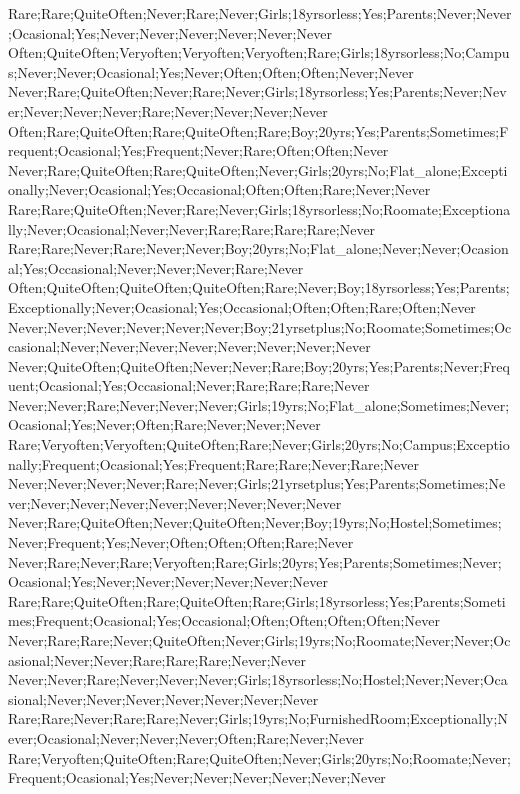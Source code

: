 Rare;Rare;QuiteOften;Never;Rare;Never;Girls;18yrsorless;Yes;Parents;Never;Never;Ocasional;Yes;Never;Never;Never;Never;Never;Never
Often;QuiteOften;Veryoften;Veryoften;Veryoften;Rare;Girls;18yrsorless;No;Campus;Never;Never;Ocasional;Yes;Never;Often;Often;Often;Never;Never
Never;Rare;QuiteOften;Never;Rare;Never;Girls;18yrsorless;Yes;Parents;Never;Never;Never;Never;Never;Rare;Never;Never;Never;Never
Often;Rare;QuiteOften;Rare;QuiteOften;Rare;Boy;20yrs;Yes;Parents;Sometimes;Frequent;Ocasional;Yes;Frequent;Never;Rare;Often;Often;Never
Never;Rare;QuiteOften;Rare;QuiteOften;Never;Girls;20yrs;No;Flat_alone;Exceptionally;Never;Ocasional;Yes;Occasional;Often;Often;Rare;Never;Never
Rare;Rare;QuiteOften;Never;Rare;Never;Girls;18yrsorless;No;Roomate;Exceptionally;Never;Ocasional;Never;Never;Rare;Rare;Rare;Rare;Never
Rare;Rare;Never;Rare;Never;Never;Boy;20yrs;No;Flat_alone;Never;Never;Ocasional;Yes;Occasional;Never;Never;Never;Rare;Never
Often;QuiteOften;QuiteOften;QuiteOften;Rare;Never;Boy;18yrsorless;Yes;Parents;Exceptionally;Never;Ocasional;Yes;Occasional;Often;Often;Rare;Often;Never
Never;Never;Never;Never;Never;Never;Boy;21yrsetplus;No;Roomate;Sometimes;Occasional;Never;Never;Never;Never;Never;Never;Never;Never
Never;QuiteOften;QuiteOften;Never;Never;Rare;Boy;20yrs;Yes;Parents;Never;Frequent;Ocasional;Yes;Occasional;Never;Rare;Rare;Rare;Never
Never;Never;Rare;Never;Never;Never;Girls;19yrs;No;Flat_alone;Sometimes;Never;Ocasional;Yes;Never;Often;Rare;Never;Never;Never
Rare;Veryoften;Veryoften;QuiteOften;Rare;Never;Girls;20yrs;No;Campus;Exceptionally;Frequent;Ocasional;Yes;Frequent;Rare;Rare;Never;Rare;Never
Never;Never;Never;Never;Rare;Never;Girls;21yrsetplus;Yes;Parents;Sometimes;Never;Never;Never;Never;Never;Never;Never;Never;Never
Never;Rare;QuiteOften;Never;QuiteOften;Never;Boy;19yrs;No;Hostel;Sometimes;Never;Frequent;Yes;Never;Often;Often;Often;Rare;Never
Never;Rare;Never;Rare;Veryoften;Rare;Girls;20yrs;Yes;Parents;Sometimes;Never;Ocasional;Yes;Never;Never;Never;Never;Never;Never
Rare;Rare;QuiteOften;Rare;QuiteOften;Rare;Girls;18yrsorless;Yes;Parents;Sometimes;Frequent;Ocasional;Yes;Occasional;Often;Often;Often;Often;Never
Never;Rare;Rare;Never;QuiteOften;Never;Girls;19yrs;No;Roomate;Never;Never;Ocasional;Never;Never;Rare;Rare;Rare;Never;Never
Never;Never;Rare;Never;Never;Never;Girls;18yrsorless;No;Hostel;Never;Never;Ocasional;Never;Never;Never;Never;Never;Never;Never
Rare;Rare;Never;Rare;Rare;Never;Girls;19yrs;No;FurnishedRoom;Exceptionally;Never;Ocasional;Never;Never;Never;Often;Rare;Never;Never
Rare;Veryoften;QuiteOften;Rare;QuiteOften;Never;Girls;20yrs;No;Roomate;Never;Frequent;Ocasional;Yes;Never;Never;Never;Never;Never;Never
